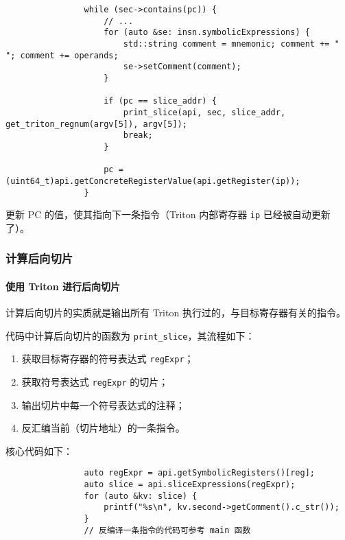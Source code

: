 \documentclass{ctexbeamer}
\begin{document}
    \begin{frame}[fragile]

        {
            \scriptsize
            \begin{verbatim}
                while (sec->contains(pc)) {
                    // ...
                    for (auto &se: insn.symbolicExpressions) {
                        std::string comment = mnemonic; comment += " "; comment += operands;
                        se->setComment(comment);
                    }

                    if (pc == slice_addr) {
                        print_slice(api, sec, slice_addr, get_triton_regnum(argv[5]), argv[5]);
                        break;
                    }

                    pc = (uint64_t)api.getConcreteRegisterValue(api.getRegister(ip));
                }
            \end{verbatim}
        }

        更新 PC 的值，使其指向下一条指令（Triton 内部寄存器 \texttt{ip} 已经被自动更新了）。
    
    \end{frame}

    \begin{frame}[fragile]
        \frametitle{计算后向切片}
        \framesubtitle{使用 Triton 进行后向切片}
    
        计算后向切片的实质就是输出所有 Triton 执行过的，与目标寄存器有关的指令。\pause

        代码中计算后向切片的函数为 \texttt{print_slice}，其流程如下：\pause

        \begin{enumerate}
            \item 获取目标寄存器的符号表达式 \texttt{regExpr}；\pause
            \item 获取符号表达式 \texttt{regExpr} 的切片；\pause
            \item 输出切片中每一个符号表达式的注释；\pause
            \item 反汇编当前（切片地址）的一条指令。\pause
        \end{enumerate}

        核心代码如下：

        {
            \small
            \begin{verbatim}
                auto regExpr = api.getSymbolicRegisters()[reg];
                auto slice = api.sliceExpressions(regExpr);
                for (auto &kv: slice) {
                    printf("%s\n", kv.second->getComment().c_str());
                }
                // 反编译一条指令的代码可参考 main 函数
            \end{verbatim}
        }
    
    \end{frame}
\end{document}

